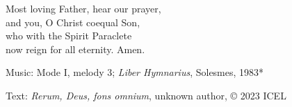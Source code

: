 \hymn



\begin{underhymnverse}
Most loving Father, hear our prayer,\\
and you, O Christ coequal Son,\\
who with the Spirit Paraclete\\
now reign for all eternity. Amen.
\end{underhymnverse}

\begin{hymnsource}
Music: Mode I, melody 3; \emph{Liber Hymnarius}, Solesmes, 1983*

Text: \emph{Rerum, Deus, fons omnium}, unknown author, © 2023 ICEL
\end{hymnsource}
